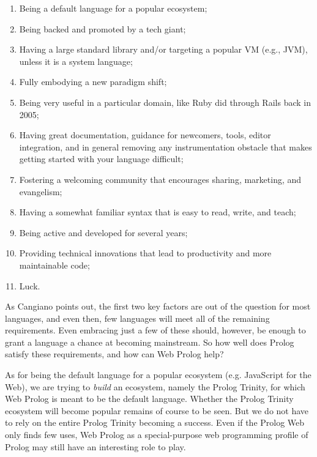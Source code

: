 \begin{enumerate}
 
\item Being a default language for a popular ecosystem;

\item Being backed and promoted by a tech giant;

\item Having a large standard library and/or targeting a popular VM (e.g., JVM), unless it is a system language;

\item Fully embodying a new paradigm shift;

\item Being very useful in a particular domain, like Ruby did through Rails back in 2005;

\item Having great documentation, guidance for newcomers, tools, editor integration, and in general removing any instrumentation obstacle that makes getting started with your language difficult;

\item Fostering a welcoming community that encourages sharing, marketing, and evangelism;

\item Having a somewhat familiar syntax that is easy to read, write, and teach;

\item Being active and developed for several years;

\item Providing technical innovations that lead to productivity and more maintainable code;

\item Luck.

\end{enumerate}

\noindent As Cangiano points out, the first two key factors are out of the question for most languages, and even then, few languages will meet all of the remaining requirements. Even embracing just a few of these should, however, be enough to grant a language a chance at becoming mainstream. So how well does Prolog satisfy these requirements, and how can Web Prolog help?

As for being the default language for a popular ecosystem (e.g. JavaScript for the Web), we are trying to \textit{build} an ecosystem, namely the Prolog Trinity, for which Web Prolog is meant to be the default language. Whether the Prolog Trinity ecosystem will become popular remains of course to be seen. But we do not have to rely on the entire Prolog Trinity becoming a success. Even if the Prolog Web only finds few uses, Web Prolog as a special-purpose web programming profile of Prolog may still have an interesting role to play.

